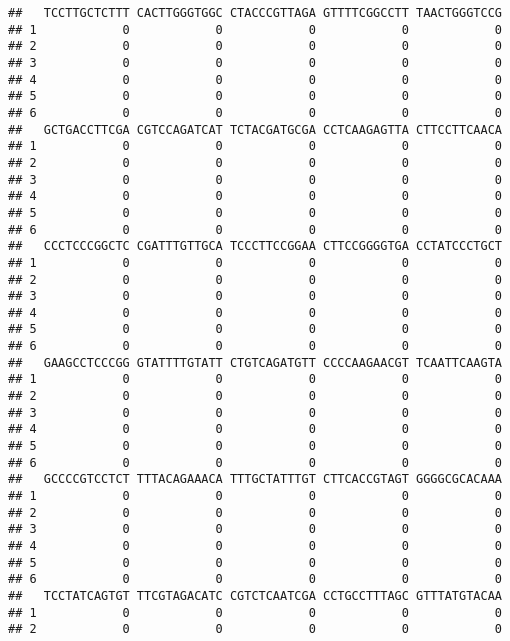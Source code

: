 \documentclass[]{article}
\begin{document}
\begin{verbatim}
##   TCCTTGCTCTTT CACTTGGGTGGC CTACCCGTTAGA GTTTTCGGCCTT TAACTGGGTCCG
## 1            0            0            0            0            0
## 2            0            0            0            0            0
## 3            0            0            0            0            0
## 4            0            0            0            0            0
## 5            0            0            0            0            0
## 6            0            0            0            0            0
##   GCTGACCTTCGA CGTCCAGATCAT TCTACGATGCGA CCTCAAGAGTTA CTTCCTTCAACA
## 1            0            0            0            0            0
## 2            0            0            0            0            0
## 3            0            0            0            0            0
## 4            0            0            0            0            0
## 5            0            0            0            0            0
## 6            0            0            0            0            0
##   CCCTCCCGGCTC CGATTTGTTGCA TCCCTTCCGGAA CTTCCGGGGTGA CCTATCCCTGCT
## 1            0            0            0            0            0
## 2            0            0            0            0            0
## 3            0            0            0            0            0
## 4            0            0            0            0            0
## 5            0            0            0            0            0
## 6            0            0            0            0            0
##   GAAGCCTCCCGG GTATTTTGTATT CTGTCAGATGTT CCCCAAGAACGT TCAATTCAAGTA
## 1            0            0            0            0            0
## 2            0            0            0            0            0
## 3            0            0            0            0            0
## 4            0            0            0            0            0
## 5            0            0            0            0            0
## 6            0            0            0            0            0
##   GCCCCGTCCTCT TTTACAGAAACA TTTGCTATTTGT CTTCACCGTAGT GGGGCGCACAAA
## 1            0            0            0            0            0
## 2            0            0            0            0            0
## 3            0            0            0            0            0
## 4            0            0            0            0            0
## 5            0            0            0            0            0
## 6            0            0            0            0            0
##   TCCTATCAGTGT TTCGTAGACATC CGTCTCAATCGA CCTGCCTTTAGC GTTTATGTACAA
## 1            0            0            0            0            0
## 2            0            0            0            0            0

\end{verbatim}
\end{document}
